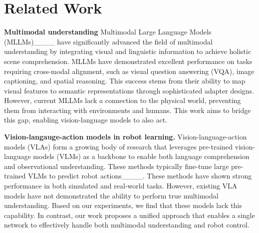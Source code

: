 \section{Related Work}
\textbf{Multimodal understanding}
Multimodal Large Language Models (MLLMs)____ have significantly advanced the field of multimodal understanding by integrating visual and linguistic information to achieve holistic scene comprehension. MLLMs have demonstrated excellent performance on tasks requiring cross-modal alignment, such as visual question answering (VQA), image captioning, and spatial reasoning. This success stems from their ability to map visual features to semantic representations through sophisticated adapter designs. However, current MLLMs lack a connection to the physical world, preventing them from interacting with environments and humans. This work aims to bridge this gap, enabling vision-language models to also act.

\textbf{Vision-langauge-action models in robot learning.} Vision-language-action models (VLAs) form a growing body of research that leverages pre-trained vision-language models (VLMs) as a backbone to enable both language comprehension and observational understanding. These methods typically fine-tune large pre-trained VLMs to predict robot actions____. These methods have shown strong performance in both simulated and real-world tasks. However, existing VLA models have not demonstrated the ability to perform true multimodal understanding. Based on our experiments, we find that these models lack this capability. In contrast, our work proposes a unified approach that enables a single network to effectively handle both multimodal understanding and robot control.